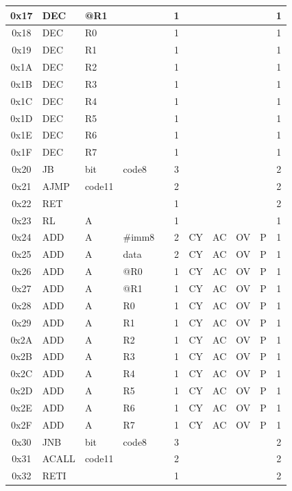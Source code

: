 \documentclass[a4paper,twoside,12pt]{book}
\begin{document}
{\begin{longtable}{|c|l|lll|c|llll|c|}
		0x17	& DEC	& @R1	&	&	& 1	&	&	&	&	& 1	\\\hline
		0x18	& DEC	& R0	&	&	& 1	&	&	&	&	& 1	\\\hline
		0x19	& DEC	& R1	&	&	& 1	&	&	&	&	& 1	\\\hline
		0x1A	& DEC	& R2	&	&	& 1	&	&	&	&	& 1	\\\hline
		0x1B	& DEC	& R3	&	&	& 1	&	&	&	&	& 1	\\\hline
		0x1C	& DEC	& R4	&	&	& 1	&	&	&	&	& 1	\\\hline
		0x1D	& DEC	& R5	&	&	& 1	&	&	&	&	& 1	\\\hline
		0x1E	& DEC	& R6	&	&	& 1	&	&	&	&	& 1	\\\hline
		0x1F	& DEC	& R7	&	&	& 1	&	&	&	&	& 1	\\\hline
		0x20	& JB	& bit	& code8	&	& 3	&	&	&	&	& 2	\\\hline
		0x21	& AJMP	& code11&	&	& 2	&	&	&	&	& 2	\\\hline
		0x22	& RET	&	&	&	& 1	&	&	&	&	& 2	\\\hline
		0x23	& RL	& A	&	&	& 1	&	&	&	&	& 1	\\\hline
		0x24	& ADD	& A	& \#imm8&	& 2	& CY	& AC	& OV	& P	& 1	\\\hline
		0x25	& ADD	& A	& data	&	& 2	& CY	& AC	& OV	& P	& 1	\\\hline
		0x26	& ADD	& A	& @R0	&	& 1	& CY	& AC	& OV	& P	& 1	\\\hline
		0x27	& ADD	& A	& @R1	&	& 1	& CY	& AC	& OV	& P	& 1	\\\hline
		0x28	& ADD	& A	& R0	&	& 1	& CY	& AC	& OV	& P	& 1	\\\hline
		0x29	& ADD	& A	& R1	&	& 1	& CY	& AC	& OV	& P	& 1	\\\hline
		0x2A	& ADD	& A	& R2	&	& 1	& CY	& AC	& OV	& P	& 1	\\\hline
		0x2B	& ADD	& A	& R3	&	& 1	& CY	& AC	& OV	& P	& 1	\\\hline
		0x2C	& ADD	& A	& R4	&	& 1	& CY	& AC	& OV	& P	& 1	\\\hline
		0x2D	& ADD	& A	& R5	&	& 1	& CY	& AC	& OV	& P	& 1	\\\hline
		0x2E	& ADD	& A	& R6	&	& 1	& CY	& AC	& OV	& P	& 1	\\\hline
		0x2F	& ADD	& A	& R7	&	& 1	& CY	& AC	& OV	& P	& 1	\\\hline
		0x30	& JNB	& bit	& code8	&	& 3	&	&	&	&	& 2	\\\hline
		0x31	& ACALL	& code11&	&	& 2	&	&	&	&	& 2	\\\hline
		0x32	& RETI	&	&	&	& 1	&	&	&	&	& 2	\\\hline

\end{longtable}}
\end{document}

